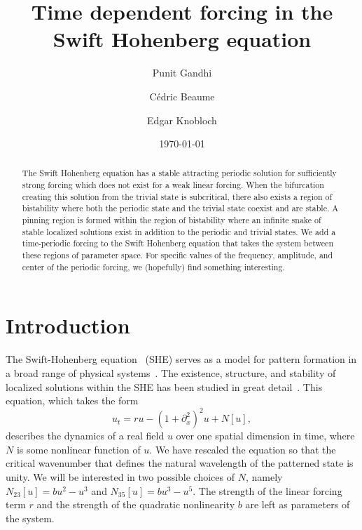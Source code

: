 \documentclass[pre,preprint,superscriptaddress]{revtex4-1}
\begin{document}
\title{Time dependent forcing in the Swift Hohenberg equation}
\author{Punit Gandhi}
\author{C\'edric Beaume}
\author{Edgar Knobloch}
\date{\today}

\begin{abstract}
The Swift Hohenberg equation has a stable attracting periodic solution for sufficiently strong forcing which does not exist for a weak linear forcing.  When the bifurcation creating this solution from the trivial state is subcritical, there also exists a region of bistability where both the periodic state and the trivial state coexist and are stable.  A pinning region is formed within the region of bistability where an infinite snake of stable localized solutions exist in addition to the periodic and trivial states.   We add a time-periodic forcing to the Swift Hohenberg equation that takes the system between these regions of parameter space.  For specific values of the frequency, amplitude, and center of the periodic forcing, we (hopefully) find something interesting.
\end{abstract}

\maketitle

\section{Introduction}
The Swift-Hohenberg equation~\cite{swift1977} (SHE) serves as a model for pattern formation in a broad range of physical systems~\cite{}.  The existence, structure, and stability of localized solutions within the SHE has been studied in great detail~\cite{burke2006,burke2007snakes,burke2007stability}.   This equation, which takes the form  
\begin{equation}
u_t= r u-\left(1+\partial_{x}^2\right)^2u+N[u]\label{eq:SH},
\end{equation}
describes the dynamics of a real field $u$ over one spatial dimension in time, where $N$ is some nonlinear function of $u$.  We have rescaled the equation so that the critical wavenumber that defines the natural wavelength of the patterned state is unity.  We will be interested in two possible choices of $N$, namely $N_{23}[u]=bu^2-u^3$ and $N_{35}[u]=b u^3-u^5$.  The strength of the linear forcing term $r$ and the strength of the quadratic nonlinearity $b$ are left as parameters of the system.  
\end{document}
